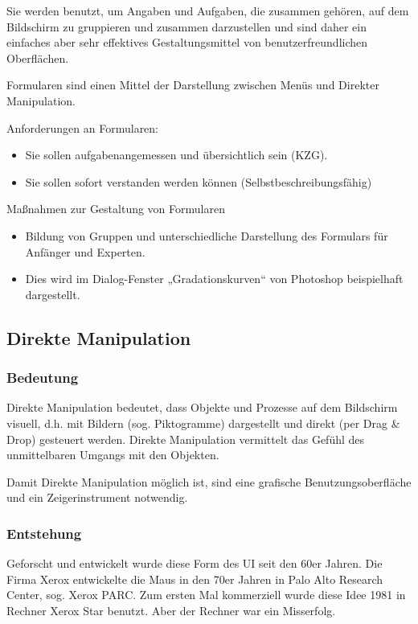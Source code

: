  Sie werden benutzt, um Angaben und Aufgaben, die zusammen gehören, auf dem Bildschirm zu gruppieren und zusammen darzustellen und sind daher ein einfaches aber sehr effektives Gestaltungsmittel von benutzerfreundlichen Oberflächen.
 
 Formularen sind einen Mittel der Darstellung zwischen Menüs und Direkter Manipulation.

Anforderungen an Formularen:
\begin{itemize}
\item Sie sollen aufgabenangemessen und übersichtlich sein (KZG).  
\item Sie sollen sofort verstanden werden können (Selbstbeschreibungsfähig)
\end{itemize}

Maßnahmen zur Gestaltung von Formularen
\begin{itemize}
\item Bildung von Gruppen und unterschiedliche Darstellung des Formulars für Anfänger und Experten.
\item Dies wird im Dialog-Fenster „Gradationskurven“ von Photoshop beispielhaft dargestellt.
\end{itemize}


\subsection{Direkte Manipulation} 
\subsubsection{Bedeutung}
Direkte Manipulation bedeutet, dass Objekte und Prozesse auf dem Bildschirm visuell, d.h. mit Bildern (sog. Piktogramme) dargestellt und direkt (per Drag \& Drop) gesteuert werden. Direkte Manipulation vermittelt das Gefühl des unmittelbaren Umgangs mit den Objekten.

Damit Direkte Manipulation möglich ist, sind eine grafische Benutzungsoberfläche und ein Zeigerinstrument notwendig.
\subsubsection{Entstehung}
Geforscht und entwickelt wurde diese Form des UI seit den 60er Jahren. Die Firma Xerox entwickelte die Maus in den 70er Jahren in Palo Alto Research Center, sog. Xerox PARC.  Zum ersten Mal kommerziell wurde diese Idee 1981 in Rechner Xerox Star benutzt. Aber der Rechner war ein Misserfolg. 

